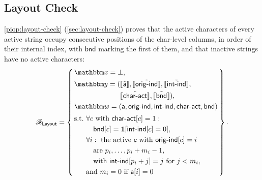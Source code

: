 \subsection{Layout Check}
\label{sec:proof-layout}
\cref{piop:layout-check} (\cref{sec:layout-check}) proves that the active characters of every active string occupy consecutive positions of the char-level columns, in order of their internal index, with $\mathsf{bnd}$ marking the first of them, and that inactive strings have no active characters:
\ifsp
\begin{displaymath}
\NPRelation_{\mathsf{Layout}} = \left\{\,
  \begin{aligned}
    & \NPInstance = \bot,\\
    & \NPInstancey = (\Oracle{\MLE{\mathsf{a}}}, \Oracle{\MLE{\mathsf{orig\text{-}ind}}}, \Oracle{\MLE{\mathsf{int\text{-}ind}}},\\
    & \phantom{\NPInstancey = (}\Oracle{\MLE{\mathsf{char\text{-}act}}}, \Oracle{\MLE{\mathsf{bnd}}}),\\
    & \NPWitness = (\mathsf{a}, \mathsf{orig\text{-}ind}, \mathsf{int\text{-}ind}, \mathsf{char\text{-}act}, \mathsf{bnd})\\[2pt]
    & \text{s.t.}\ \forall c\ \text{with}\ \mathsf{char\text{-}act}[c] = 1:\\
    & \phantom{\text{s.t.}}\ \quad \mathsf{bnd}[c] = \mathbf{1}[\mathsf{int\text{-}ind}[c] = 0],\\
    & \phantom{\text{s.t.}}\ \forall i:\ \text{the active } c \text{ with } \mathsf{orig\text{-}ind}[c] = i\\
    & \phantom{\text{s.t.}}\ \quad \text{are } p_i, \dots, p_i + m_i - 1,\\
    & \phantom{\text{s.t.}}\ \quad \text{with}\ \mathsf{int\text{-}ind}[p_i + j] = j\ \text{for}\ j < m_i,\\
    & \phantom{\text{s.t.}}\ \text{and}\ m_i = 0\ \text{if}\ \mathsf{a}[i] = 0
  \end{aligned}
\,\right\}.
\end{displaymath}
\else
